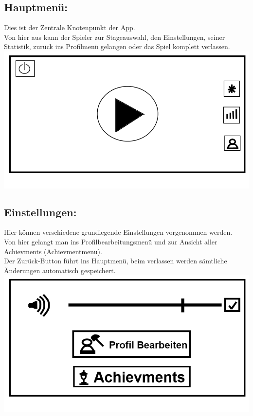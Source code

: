 \documentclass{scrartcl}
\begin{document}
\begin{enumerate}
	\begin{minipage}{1\textwidth}
		\item \subsection*{Hauptmenü:} \label{appaufbau:Hauptmenü}
		Dies ist der Zentrale Knotenpunkt der App.\\
		Von hier aus kann der Spieler zur Stageauswahl, den Einstellungen, seiner Statistik, zurück ins Profilmenü gelangen oder das Spiel komplett verlassen.\\
		\includegraphics[width=\textwidth]{assets/Mainmenu}
	\end{minipage}
	
	\begin{minipage}{1\textwidth}
		\item \subsection*{Einstellungen:}
		Hier können verschiedene grundlegende Einstellungen vorgenommen werden.\\
		Von hier gelangt man ins Profilbearbeitungsmenü und zur Ansicht aller Achievments (Achievmentmenu).\\
		Der Zurück-Button führt ins Hauptmenü, beim verlassen werden sämtliche Änderungen automatisch gespeichert.\\
		\includegraphics[width=\textwidth]{assets/Einstellungen}
	\end{minipage}


\end{enumerate}
\end{document}
